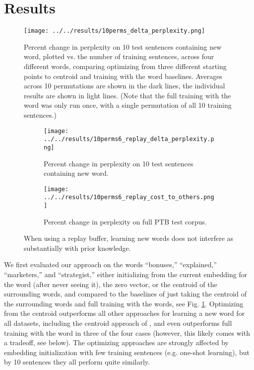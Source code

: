 \documentclass{article}
\begin{document}
\section{Results}
\begin{figure}
\centering
\texttt{[image: ../../results/10perms\_delta\_perplexity.png]}
\caption{Percent change in perplexity on 10 test sentences containing new word, plotted vs. the number of training sentences, across four different words, comparing optimizing from three different starting points to centroid and training with the word baselines. Averages across 10 permutations are shown in the dark lines, the individual results are shown in light lines. (Note that the full training with the word was only run once, with a single permutation of all 10 training sentences.)}
\label{main_results_1}
\end{figure}
\begin{figure}
\centering
\begin{subfigure}[b]{\textwidth}
\texttt{[image: ../../results/10perms6\_replay\_delta\_perplexity.png]}
\caption{Percent change in perplexity on 10 test sentences containing new word.}
\end{subfigure}
\begin{subfigure}[b]{\textwidth}
\texttt{[image: ../../results/10perms6\_replay\_cost\_to\_others.png]}
\caption{Percent change in perplexity on full PTB test corpus.}
\end{subfigure}
\caption{When using a replay buffer, learning new words does not interfere as substantially with prior knowledge.}
\label{ameliorating_interference_fig}
\end{figure}
We first evaluated our approach on the words ``bonuses,'' ``explained,'' ``marketers,'' and ``strategist,'' either initializing from the current embedding for the word (after never seeing it), the zero vector, or the centroid of the surrounding words, and compared to the baselines of just taking the centroid of the surrounding words and full training with the words, see Fig. \ref{main_results_1}. Optimizing from the centroid outperforms all other approaches for learning a new word for all datasets, including the centroid approach of \citet{Lazaridou2017}, and even outperforms full training with the word in three of the four cases (however, this likely comes with a tradeoff, see below). The optimizing approaches are strongly affected by embedding initialization with few training sentences (e.g. one-shot learning), but by 10 sentences they all perform quite similarly. \par
\end{document}
